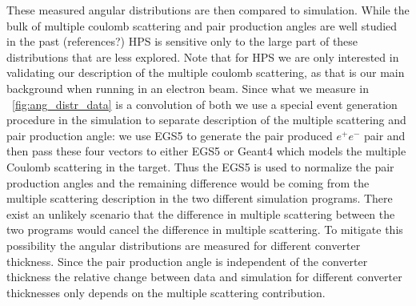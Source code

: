These measured angular distributions are then compared to simulation. 
While the bulk of multiple coulomb scattering and pair production angles 
are well studied in the past {\color{red} (references?)} HPS 
is sensitive only to the large part of these distributions that are less explored. 
Note that for HPS we are only interested in validating our description of the multiple coulomb scattering, as that 
is our main background when running in an electron beam. Since 
what we measure in ~\ref{fig:ang_distr_data} is a convolution of both we use a special event 
generation procedure in the simulation to separate description of the multiple scattering and 
pair production angle: we use {\sc EGS5} to generate the pair produced $e^+e^-$ pair 
and then pass these four vectors to either {\sc EGS5} or {\sc Geant4} which 
models the multiple Coulomb scattering in the target. Thus the {\sc EGS5} is used to normalize 
the pair production angles and the remaining difference would be coming from the 
multiple scattering description in the two different simulation programs. There exist an unlikely 
scenario that the difference in multiple scattering between the two programs would cancel the difference in multiple scattering. To mitigate this possibility the angular distributions are 
measured for different converter thickness. Since the pair production angle is independent of 
the converter thickness the relative change between data and simulation for different converter thicknesses only depends on the multiple scattering contribution. 

